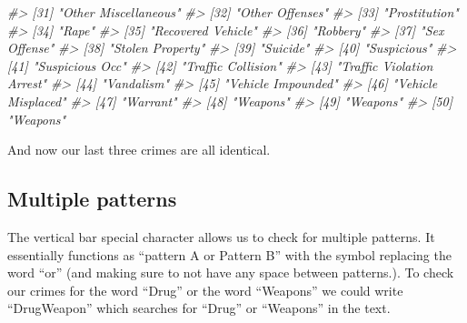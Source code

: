 \documentclass[
  12pt,
]{book}
\newenvironment{Shaded}{\begin{snugshade}}{\end{snugshade}}
\newcommand{\CommentTok}[1]{\textcolor[rgb]{0.37,0.37,0.37}{\textit{#1}}}
\begin{document}
\begin{Shaded}
\begin{Highlighting}[]
\CommentTok{\#\textgreater{} [31] "Other Miscellaneous"                       }
\CommentTok{\#\textgreater{} [32] "Other Offenses"                            }
\CommentTok{\#\textgreater{} [33] "Prostitution"                              }
\CommentTok{\#\textgreater{} [34] "Rape"                                      }
\CommentTok{\#\textgreater{} [35] "Recovered Vehicle"                         }
\CommentTok{\#\textgreater{} [36] "Robbery"                                   }
\CommentTok{\#\textgreater{} [37] "Sex Offense"                               }
\CommentTok{\#\textgreater{} [38] "Stolen Property"                           }
\CommentTok{\#\textgreater{} [39] "Suicide"                                   }
\CommentTok{\#\textgreater{} [40] "Suspicious"                                }
\CommentTok{\#\textgreater{} [41] "Suspicious Occ"                            }
\CommentTok{\#\textgreater{} [42] "Traffic Collision"                         }
\CommentTok{\#\textgreater{} [43] "Traffic Violation Arrest"                  }
\CommentTok{\#\textgreater{} [44] "Vandalism"                                 }
\CommentTok{\#\textgreater{} [45] "Vehicle Impounded"                         }
\CommentTok{\#\textgreater{} [46] "Vehicle Misplaced"                         }
\CommentTok{\#\textgreater{} [47] "Warrant"                                   }
\CommentTok{\#\textgreater{} [48] "Weapons"                                   }
\CommentTok{\#\textgreater{} [49] "Weapons"                                   }
\CommentTok{\#\textgreater{} [50] "Weapons"}
\end{Highlighting}
\end{Shaded}

And now our last three crimes are all identical.

\hypertarget{multiple-patterns}{%
\subsection{\texorpdfstring{Multiple patterns \texttt{\textbar{}}}{Multiple patterns \textbar{}}}\label{multiple-patterns}}

The vertical bar \texttt{\textbar{}} special character allows us to check for multiple patterns. It essentially functions as ``pattern A or Pattern B'' with the \texttt{\textbar{}} symbol replacing the word ``or'' (and making sure to not have any space between patterns.). To check our crimes for the word ``Drug'' or the word ``Weapons'' we could write ``Drug\textbar Weapon'' which searches for ``Drug'' or ``Weapons'' in the text.
\end{document}

